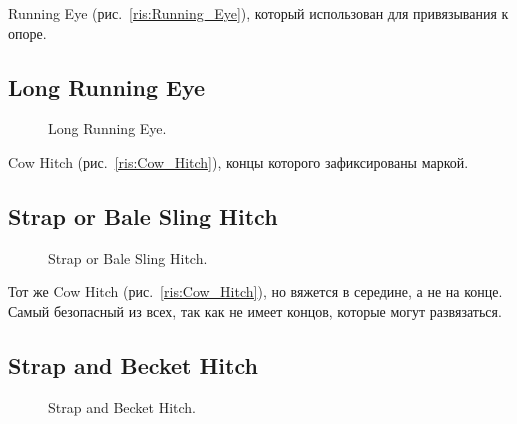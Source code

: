 Running Eye (рис.~\ref{ris:Running_Eye}), который использован для привязывания к опоре.

\subsection{Long Running Eye}

\begin{figure}[H]\centering
	\begin{minipage}{1\linewidth}
		\begin{center}
			\tcbox[enhanced jigsaw,colframe=black,opacityframe=0.5,opacityback=0.5]
			{\centering{}}
		\end{center}
	\end{minipage}
\caption{Long Running Eye.}
\label{ris:Long_Running_Eye}
\end{figure}

Cow Hitch (рис.~\ref{ris:Cow_Hitch}), концы которого зафиксированы маркой.

\subsection{Strap or Bale Sling Hitch}

\begin{figure}[H]\centering
	\begin{minipage}{1\linewidth}
		\begin{center}
			\tcbox[enhanced jigsaw,colframe=black,opacityframe=0.5,opacityback=0.5]
			{\centering{}}
		\end{center}
	\end{minipage}
\caption{Strap or Bale Sling Hitch.}
\label{ris:Bale_Sling_Hitch}
\end{figure}

Тот же Cow Hitch (рис.~\ref{ris:Cow_Hitch}), но вяжется в середине, а не на конце. Самый безопасный из всех, так как не имеет концов, которые могут развязаться.

\subsection{Strap and Becket Hitch}

\begin{figure}[H]\centering
	\begin{minipage}{1\linewidth}
		\begin{center}
			\tcbox[enhanced jigsaw,colframe=black,opacityframe=0.5,opacityback=0.5]
			{\centering{}}
		\end{center}
	\end{minipage}
\caption{Strap and Becket Hitch.}
\label{ris:Strap_and_Becket_Hitch}
\end{figure}

